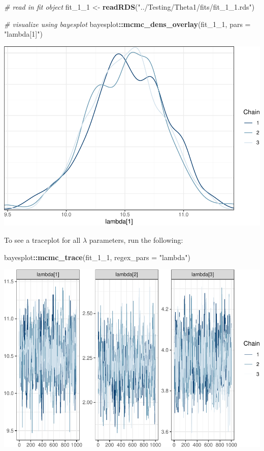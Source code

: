 \documentclass[
]{article}
\newenvironment{Shaded}{\begin{snugshade}}{\end{snugshade}}
\newcommand{\AttributeTok}[1]{\textcolor[rgb]{0.13,0.29,0.53}{#1}}
\newcommand{\CommentTok}[1]{\textcolor[rgb]{0.56,0.35,0.01}{\textit{#1}}}
\newcommand{\FunctionTok}[1]{\textcolor[rgb]{0.13,0.29,0.53}{\textbf{#1}}}
\newcommand{\NormalTok}[1]{#1}
\newcommand{\OtherTok}[1]{\textcolor[rgb]{0.56,0.35,0.01}{#1}}
\newcommand{\SpecialCharTok}[1]{\textcolor[rgb]{0.81,0.36,0.00}{\textbf{#1}}}
\newcommand{\StringTok}[1]{\textcolor[rgb]{0.31,0.60,0.02}{#1}}
\begin{document}
\begin{Shaded}
\begin{Highlighting}[]
\CommentTok{\# read in fit object}
\NormalTok{fit\_1\_1 }\OtherTok{\textless{}{-}} \FunctionTok{readRDS}\NormalTok{(}\StringTok{"../Testing/Theta1/fits/fit\_1\_1.rds"}\NormalTok{)}

\CommentTok{\# visualize using bayesplot}
\NormalTok{bayesplot}\SpecialCharTok{::}\FunctionTok{mcmc\_dens\_overlay}\NormalTok{(fit\_1\_1, }\AttributeTok{pars =} \StringTok{"lambda[1]"}\NormalTok{)}
\end{Highlighting}
\end{Shaded}

\includegraphics{Vignette_files/figure-latex/unnamed-chunk-15-1.pdf}

\linespread{1}

To see a traceplot for all \(\lambda\) parameters, run the following:

\linespread{1}

\begin{Shaded}
\begin{Highlighting}[]
\NormalTok{bayesplot}\SpecialCharTok{::}\FunctionTok{mcmc\_trace}\NormalTok{(fit\_1\_1, }\AttributeTok{regex\_pars =} \StringTok{"lambda"}\NormalTok{)}
\end{Highlighting}
\end{Shaded}

\includegraphics{Vignette_files/figure-latex/unnamed-chunk-16-1.pdf}
\end{document}
